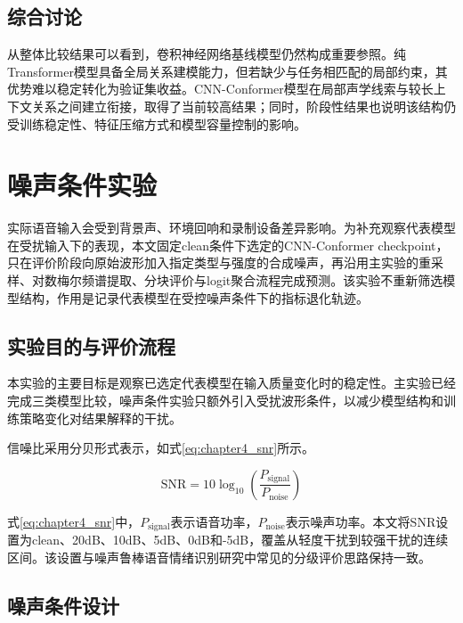 \subsection{综合讨论}

从整体比较结果可以看到，卷积神经网络基线模型仍然构成重要参照。纯Transformer模型具备全局关系建模能力，但若缺少与任务相匹配的局部约束，其优势难以稳定转化为验证集收益。CNN-Conformer模型在局部声学线索与较长上下文关系之间建立衔接，取得了当前较高结果；同时，阶段性结果也说明该结构仍受训练稳定性、特征压缩方式和模型容量控制的影响。

\section{噪声条件实验}

实际语音输入会受到背景声、环境回响和录制设备差异影响。为补充观察代表模型在受扰输入下的表现，本文固定clean条件下选定的CNN-Conformer checkpoint，只在评价阶段向原始波形加入指定类型与强度的合成噪声，再沿用主实验的重采样、对数梅尔频谱提取、分块评价与logit聚合流程完成预测。该实验不重新筛选模型结构，作用是记录代表模型在受控噪声条件下的指标退化轨迹\cite{zhou2020using,leem2024selective,thanh2024robust,tzeng2025noiserobust,liu2023dualrobustness}。

\subsection{实验目的与评价流程}

本实验的主要目标是观察已选定代表模型在输入质量变化时的稳定性。主实验已经完成三类模型比较，噪声条件实验只额外引入受扰波形条件，以减少模型结构和训练策略变化对结果解释的干扰。

信噪比采用分贝形式表示，如式\ref{eq:chapter4_snr}所示。

\begin{equation}
    \mathrm{SNR}=10\log_{10}\left(\frac{P_{\mathrm{signal}}}{P_{\mathrm{noise}}}\right)
    \label{eq:chapter4_snr}
\end{equation}

式\ref{eq:chapter4_snr}中，$P_{\mathrm{signal}}$表示语音功率，$P_{\mathrm{noise}}$表示噪声功率。本文将SNR设置为clean、20dB、10dB、5dB、0dB和-5dB，覆盖从轻度干扰到较强干扰的连续区间。该设置与噪声鲁棒语音情绪识别研究中常见的分级评价思路保持一致\cite{zhou2020using,thanh2024robust,tzeng2025noiserobust}。

\subsection{噪声条件设计}

